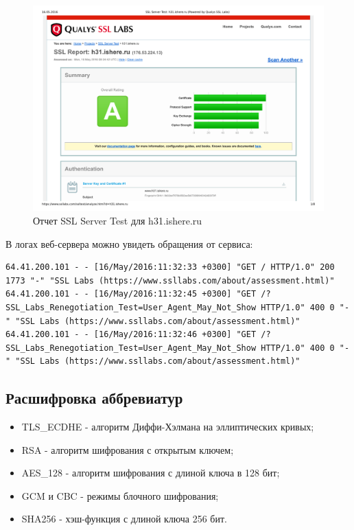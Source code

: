 \begin{figure}[H]
	\centering
	\includegraphics[width=\textwidth]{test1.pdf}
	\caption{Отчет SSL Server Test для h31.ishere.ru}
\end{figure}

В логах веб-сервера можно увидеть обращения от сервиса:

\begin{lstlisting}
64.41.200.101 - - [16/May/2016:11:32:33 +0300] "GET / HTTP/1.0" 200 1773 "-" "SSL Labs (https://www.ssllabs.com/about/assessment.html)"
64.41.200.101 - - [16/May/2016:11:32:45 +0300] "GET /?SSL_Labs_Renegotiation_Test=User_Agent_May_Not_Show HTTP/1.0" 400 0 "-" "SSL Labs (https://www.ssllabs.com/about/assessment.html)"
64.41.200.101 - - [16/May/2016:11:32:46 +0300] "GET /?SSL_Labs_Renegotiation_Test=User_Agent_May_Not_Show HTTP/1.0" 400 0 "-" "SSL Labs (https://www.ssllabs.com/about/assessment.html)"
\end{lstlisting}

\subsection{Расшифровка аббревиатур}
\begin{itemize}
	\item TLS\_ECDHE - алгоритм Диффи-Хэлмана на эллиптических кривых;
	\item RSA - алгоритм шифрования с открытым ключем;
	\item AES\_128 - алгоритм шифрования с длиной ключа в 128 бит;
	\item GCM и CBC - режимы блочного шифрования;
	\item SHA256 - хэш-функция с длиной ключа 256 бит.
\end{itemize}

